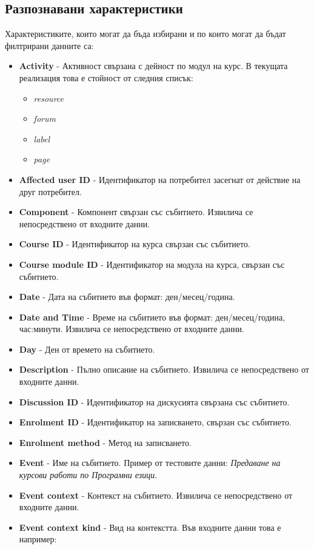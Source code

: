 \documentclass[a4paper, 12pt]{article}
\begin{document}
\subsection{Разпознавани характеристики}
Характеристиките, които могат да бъда избирани и по които могат да бъдат филтрирани данните са:
\begin{itemize}
\item \textbf{Activity} - Активност свързана с дейност по модул на курс.
В текущата реализация това е стойност от следния списък:
\begin{itemize}
\item \textit{resource}
\item \textit{forum}
\item \textit{label}
\item \textit{page}
\end{itemize}
\item \textbf{Affected user ID} - Идентификатор на потребител засегнат от действие на друг потребител.
\item \textbf{Component} - Компонент свързан със събитието. Извилича се непосредствено от входните данни.
\item \textbf{Course ID} - Идентификатор на курса свързан със събитието.
\item \textbf{Course module ID} - Идентификатор на модула на курса, свързан със събитието.
\item \textbf{Date} - Дата на събитието във формат: ден/месец/година.
\item \textbf{Date and Time} - Време на събитието във формат: ден/месец/година, час:минути.
Извилича се непосредствено от входните данни.
\item \textbf{Day} - Ден от времето на събитието.
\item \textbf{Description} - Пълно описание на събитието. Извилича се непосредствено от входните данни.
\item \textbf{Discussion ID} - Идентификатор на дискусията свързана със събитието.
\item \textbf{Enrolment ID} - Идентификатор на записването, свързан със събитието.
\item \textbf{Enrolment method} - Метод на записването.
\item \textbf{Event} - Име на събитието. Пример от тестовите данни: \textit{Предаване на курсови работи по Програмни езици}.
\item \textbf{Event context} - Контекст на събитието. Извилича се непосредствено от входните данни.
\item \textbf{Event context kind} - Вид на контекстта. Във входните данни това е например:

\end{itemize}
\end{document}
